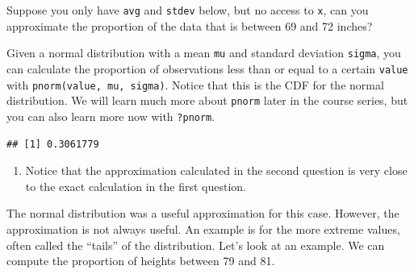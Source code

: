 \documentclass[
]{article}
\newenvironment{Shaded}{\begin{snugshade}}{\end{snugshade}}
\newcommand{\DecValTok}[1]{\textcolor[rgb]{0.00,0.00,0.81}{#1}}
\newcommand{\KeywordTok}[1]{\textcolor[rgb]{0.13,0.29,0.53}{\textbf{#1}}}
\newcommand{\NormalTok}[1]{#1}
\newcommand{\OperatorTok}[1]{\textcolor[rgb]{0.81,0.36,0.00}{\textbf{#1}}}
\newcommand{\StringTok}[1]{\textcolor[rgb]{0.31,0.60,0.02}{#1}}
\providecommand{\tightlist}{%
  \setlength{\itemsep}{0pt}\setlength{\parskip}{0pt}}
\begin{document}
Suppose you only have \texttt{avg} and \texttt{stdev} below, but no
access to \texttt{x}, can you approximate the proportion of the data
that is between 69 and 72 inches?

Given a normal distribution with a mean \texttt{mu} and standard
deviation \texttt{sigma}, you can calculate the proportion of
observations less than or equal to a certain \texttt{value} with
\texttt{pnorm(value,\ mu,\ sigma)}. Notice that this is the CDF for the
normal distribution. We will learn much more about \texttt{pnorm} later
in the course series, but you can also learn more now with
\texttt{?pnorm}.

\begin{Shaded}
\end{Shaded}

\begin{verbatim}
## [1] 0.3061779
\end{verbatim}

\begin{enumerate}
\def\labelenumi{\arabic{enumi}.}
\setcounter{enumi}{2}
\tightlist
\item
  Notice that the approximation calculated in the second question is
  very close to the exact calculation in the first question.
\end{enumerate}

The normal distribution was a useful approximation for this case.
However, the approximation is not always useful. An example is for the
more extreme values, often called the ``tails'' of the distribution.
Let's look at an example. We can compute the proportion of heights
between 79 and 81.

\begin{Shaded}
\end{Shaded}
\end{document}

